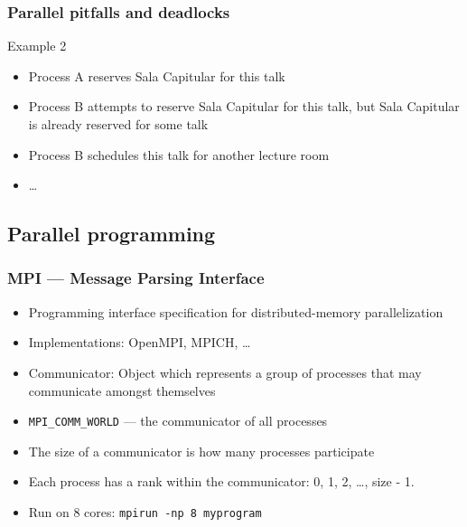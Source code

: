 \documentclass[usenames,dvipsnames,mathserif,compress]{beamer}
\begin{document}
\begin{frame}
  \frametitle{Parallel pitfalls and deadlocks}
  \begin{block}{Example 2}
    \begin{itemize}
    \item Process A reserves Sala Capitular for this talk
    \item Process B attempts to reserve Sala Capitular for this talk,
      but Sala Capitular is already reserved for some talk
    \item Process B schedules this talk for another lecture room
    \item \ldots
  \end{itemize}
  \end{block}
\end{frame}

\subsection*{Parallel programming}

\begin{frame}[fragile]
  \frametitle{MPI --- Message Parsing Interface}
  \begin{itemize}
  \item Programming interface specification for distributed-memory parallelization
  \item Implementations: OpenMPI, MPICH, \ldots
  \item \alert{Communicator}: Object which represents a group of processes that may communicate amongst themselves
  \item \verb#MPI_COMM_WORLD# --- the communicator of all processes
  \item The \alert{size} of a communicator is how many processes participate
  \item Each process has a \alert{rank} within the communicator: 0, 1, 2, \ldots, size - 1.
  \item Run on 8 cores: \texttt{mpirun -np 8 myprogram}
  \end{itemize}
\end{frame}
\end{document}
